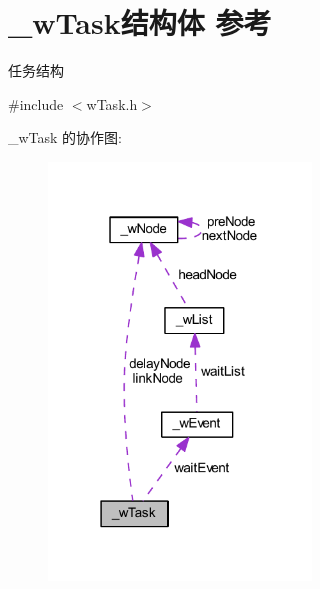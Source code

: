 \hypertarget{struct__w_task}{}\section{\+\_\+w\+Task结构体 参考}
\label{struct__w_task}


任务结构  




{\ttfamily \#include $<$w\+Task.\+h$>$}



\+\_\+w\+Task 的协作图\+:
\nopagebreak
\begin{figure}[H]
\begin{center}
\leavevmode
\includegraphics[width=198pt]{struct__w_task__coll__graph}
\end{center}
\end{figure}
